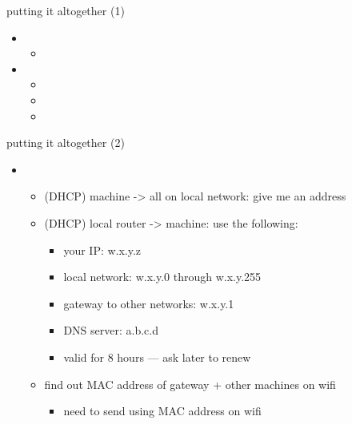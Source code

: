 \begin{frame}{putting it altogether (1)}
    \begin{itemize}
    \item {}
        \begin{itemize}
        \item<2-> 
        \end{itemize}
    \item {}
        \begin{itemize}
        \item<3-> 
        \item<3-> 
        \item<3-> 
        \end{itemize}
    \end{itemize}
\end{frame}


\begin{frame}{putting it altogether (2)}
    \begin{itemize}
    \item {}
        \begin{itemize}
        \item<2-> (DHCP) machine -> all on local network: give me an address
        \item<2-> (DHCP) local router -> machine: use the following: 
            \begin{itemize}
            \item your IP: w.x.y.z
            \item local network: w.x.y.0 through w.x.y.255
            \item gateway to other networks: w.x.y.1
            \item DNS server: a.b.c.d
            \item valid for 8 hours --- ask later to renew
            \end{itemize}
        \item<3-> find out MAC address of gateway + other machines on wifi
            \begin{itemize}
            \item need to send using MAC address on wifi
            \end{itemize}
        \end{itemize}
    \end{itemize}
\end{frame}

